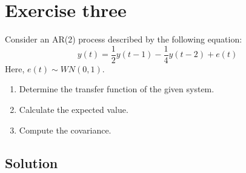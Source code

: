 \section{Exercise three}

Consider an AR(2) process described by the following equation:
\[y(t)=\dfrac{1}{2}y(t-1)-\dfrac{1}{4}y(t-2)+e(t)\]
Here, $e(t)\sim WN(0,1)$. 
\begin{enumerate}
    \item Determine the transfer function of the given system.
    \item Calculate the expected value.
    \item Compute the covariance.
\end{enumerate}

\subsection*{Solution}
